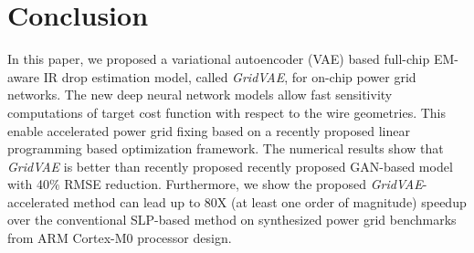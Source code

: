 \documentclass[journal]{IEEEtran}
\begin{document}


\section{Conclusion}
\label{sec:conclusion}
In this paper, we proposed a variational autoencoder (VAE) based
full-chip EM-aware IR drop estimation model, called {\it GridVAE}, for
on-chip power grid networks. The new deep neural network models allow
fast sensitivity computations of target cost function with respect to
the wire geometries. This enable accelerated power grid fixing based
on a recently proposed linear programming based optimization
framework.  The numerical results show that {\it GridVAE} is better
than recently proposed recently proposed GAN-based model with 40$\%$
RMSE reduction.  Furthermore, we show the proposed {\it
  GridVAE}-accelerated method can lead up to 80X (at least one order
of magnitude) speedup over the conventional SLP-based method on
synthesized power grid benchmarks from ARM Cortex-M0 processor design.






%
%
\end{document}
